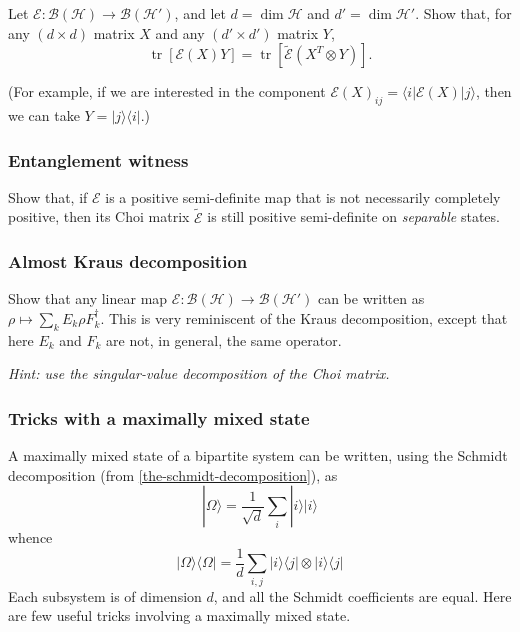 \documentclass[fleqn]{article}
\begin{document}
Let \(\mathcal{E}\colon\mathcal{B}(\mathcal{H})\to\mathcal{B}(\mathcal{H}')\), and let \(d=\dim\mathcal{H}\) and \(d'=\dim\mathcal{H}'\).
Show that, for any \((d\times d)\) matrix \(X\) and any \((d'\times d')\) matrix \(Y\),
\[
  \operatorname{tr}[\mathcal{E}(X)Y]
  = \operatorname{tr}[\widetilde{\mathcal{E}} (X^T\otimes Y)].
\]

(For example, if we are interested in the component \(\mathcal{E}(X)_{ij}=\langle i|\mathcal{E}(X)|j\rangle\), then we can take \(Y=|j\rangle\langle i|\).)

\hypertarget{entanglement-witness}{%
\subsubsection{Entanglement witness}\label{entanglement-witness}}

Show that, if \(\mathcal{E}\) is a positive semi-definite map that is not necessarily completely positive, then its Choi matrix \(\widetilde{\mathcal{E}}\) is still positive semi-definite on \emph{separable} states.

\hypertarget{almost-kraus-decomposition}{%
\subsubsection{Almost Kraus decomposition}\label{almost-kraus-decomposition}}

Show that any linear map \(\mathcal{E}\colon\mathcal{B}(\mathcal{H})\to\mathcal{B}(\mathcal{H}')\) can be written as \(\rho\mapsto\sum_k E_k\rho F_k^\dagger\).
This is very reminiscent of the Kraus decomposition, except that here \(E_k\) and \(F_k\) are not, in general, the same operator.

\emph{Hint: use the singular-value decomposition of the Choi matrix.}

\hypertarget{tricks-with-a-maximally-mixed-state}{%
\subsubsection{Tricks with a maximally mixed state}\label{tricks-with-a-maximally-mixed-state}}

A maximally mixed state of a bipartite system can be written, using the Schmidt decomposition (from \ref{the-schmidt-decomposition}), as
\[
  |\Omega\rangle
  = \frac{1}{\sqrt d}\sum_i |i\rangle|i\rangle
\]
whence
\[
  |\Omega\rangle\langle\Omega|
  = \frac{1}{d} \sum_{i,j}|i\rangle\langle j|\otimes|i\rangle\langle j|
\]
Each subsystem is of dimension \(d\), and all the Schmidt coefficients are equal.
Here are few useful tricks involving a maximally mixed state.
\end{document}
